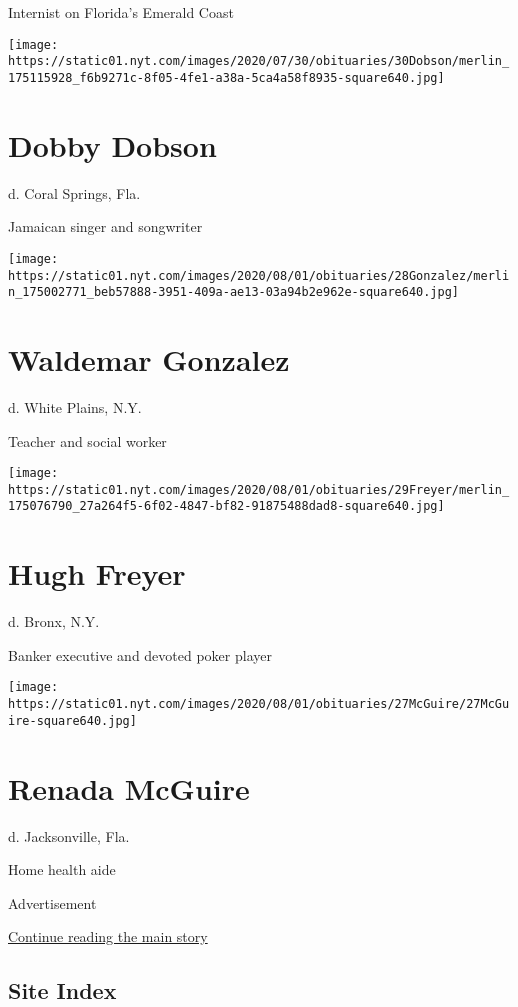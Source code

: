 Internist on Florida's Emerald Coast

\texttt{[image: https://static01.nyt.com/images/2020/07/30/obituaries/30Dobson/merlin\_175115928\_f6b9271c-8f05-4fe1-a38a-5ca4a58f8935-square640.jpg]}

\hypertarget{dobby-dobson}{%
\section{Dobby Dobson}\label{dobby-dobson}}

d. Coral Springs, Fla.

Jamaican singer and songwriter

\texttt{[image: https://static01.nyt.com/images/2020/08/01/obituaries/28Gonzalez/merlin\_175002771\_beb57888-3951-409a-ae13-03a94b2e962e-square640.jpg]}

\hypertarget{waldemar-gonzalez}{%
\section{Waldemar Gonzalez}\label{waldemar-gonzalez}}

d. White Plains, N.Y.

Teacher and social worker

\texttt{[image: https://static01.nyt.com/images/2020/08/01/obituaries/29Freyer/merlin\_175076790\_27a264f5-6f02-4847-bf82-91875488dad8-square640.jpg]}

\hypertarget{hugh-freyer}{%
\section{Hugh Freyer}\label{hugh-freyer}}

d. Bronx, N.Y.

Banker executive and devoted poker player

\texttt{[image: https://static01.nyt.com/images/2020/08/01/obituaries/27McGuire/27McGuire-square640.jpg]}

\hypertarget{renada-mcguire}{%
\section{Renada McGuire}\label{renada-mcguire}}

d. Jacksonville, Fla.

Home health aide

Advertisement

\protect\hyperlink{after-bottom}{Continue reading the main story}

\hypertarget{site-index}{%
\subsection{Site Index}\label{site-index}}

